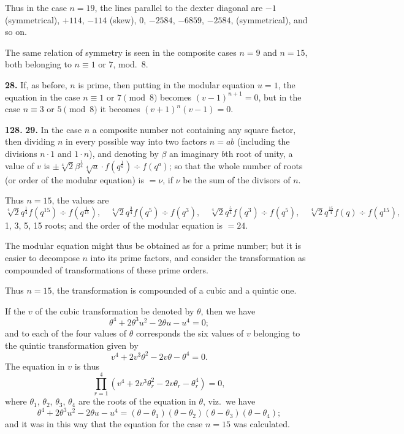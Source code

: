 \documentclass[11pt,a4paper]{book}
\begin{document}
Thus in the case $n = 19$, the lines parallel to the dexter diagonal are $-1$ (symmetrical), $+114$, $-114$ (skew), $0$, $-2584$, $-6859$, $-2584$, (symmetrical), and so on.

The same relation of symmetry is seen in the composite cases $n = 9$ and $n = 15$, both belonging to $n \equiv 1$ or $7$, mod.~8.

\medskip
\noindent\textbf{28.} If, as before, $n$ is prime, then putting in the modular equation $u = 1$, the equation in the case $n \equiv 1$ or $7 \pmod{8}$ becomes $(v - 1)^{n+1} = 0$, but in the case $n \equiv 3$ or $5 \pmod{8}$ it becomes $(v + 1)^n(v - 1) = 0$.


\noindent\textbf{128.} \textbf{29.} In the case $n$ a composite number not containing any square factor, then dividing $n$ in every possible way into two factors $n = ab$ (including the divisions $n \cdot 1$ and $1 \cdot n$), and denoting by $\beta$ an imaginary $b$th root of unity, a value of $v$ is $\pm\sqrt[4]{2}\beta^{\frac{1}{4}}\sqrt[4]{a} \cdot f(q^{\frac{1}{a}}) \div f(q^a)$; so that the whole number of roots (or order of the modular equation) is $= \nu$, if $\nu$ be the sum of the divisors of $n$.

Thus $n = 15$, the values are
\[
\sqrt[4]{2}q^{\frac{1}{4}}f(q^{15}) \div f(q^{\frac{1}{15}}), \quad
\sqrt[4]{2}q^{\frac{3}{4}}f(q^5) \div f(q^3), \quad
\sqrt[4]{2}q^{\frac{5}{4}}f(q^3) \div f(q^5), \quad
\sqrt[4]{2}q^{\frac{15}{4}}f(q) \div f(q^{15}),
\]
1, 3, 5, 15 roots; and the order of the modular equation is $= 24$.

The modular equation might thus be obtained as for a prime number; but it is easier to decompose $n$ into its prime factors, and consider the transformation as compounded of transformations of these prime orders.

Thus $n = 15$, the transformation is compounded of a cubic and a quintic one.

If the $v$ of the cubic transformation be denoted by $\theta$, then we have
\[
\theta^4 + 2\theta^3u^2 - 2\theta u - u^4 = 0;
\]
and to each of the four values of $\theta$ corresponds the six values of $v$ belonging to the quintic transformation given by
\[
v^4 + 2v^3\theta^2 - 2v\theta - \theta^4 = 0.
\]
The equation in $v$ is thus
\[
\prod_{r=1}^{4}(v^4 + 2v^3\theta_r^2 - 2v\theta_r - \theta_r^4) = 0,
\]
where $\theta_1$, $\theta_2$, $\theta_3$, $\theta_4$ are the roots of the equation in $\theta$, viz.\ we have
\[
\theta^4 + 2\theta^3u^2 - 2\theta u - u^4 = (\theta - \theta_1)(\theta - \theta_2)(\theta - \theta_3)(\theta - \theta_4);
\]
and it was in this way that the equation for the case $n = 15$ was calculated.
\end{document}
